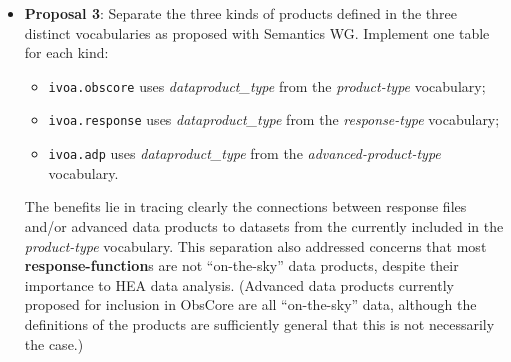 \begin{itemize}
This approach is included largely for compatibility with the ObsCore Recommendation Version 1.1, which has a limited set of {\em dataproduct\_type\/}s and so requires the use of {\em dataproduct\_subtype\/} to discriminate between different data product types that share the same {\em dataproduct\_type\/}.  

A disadvantage of this approach is that queries on two ObsCore attributes are required to identify certain types of data products, for example different types of {\em response-function\/}s.  The interpretation  of the {\em dataproduct\_subtype\/} attribute may be ambiguous as the content could be ({\em e.g.\/}) a type of {\bf response-function}, or a category of image ({\em e.g.\/}, an excess map or significance map) or some specific description chosen by a specific archive.

A standardized vocabulary for {\em dataproduct\_subtype\/} will be beneficial.  We have proposed standardized terms for various types of {\bf response-function}s in \S~5.  However, there are several types of images that are commonly used in \gls{HEA} that could, with some additional discussion, also be standardized.

However, the ability for each individual archive to use {\em dataproduct\_subtype\/} ``to more precisely define the nature of the dataset'' (ObsCore Recommendation Version 1.1 \S~4.1) should not be discounted.  Each archive is likely to have many different types of data products that would otherwise have the same {\em dataproduct\_type\/} that will need to be discriminated to be useful.  Some data products may be unique to a particular observatory but nevertheless highly significant for end-users of that observatory's data.

\item {\bf Proposal 3}: Separate the three kinds of products defined in the three distinct vocabularies as proposed with Semantics WG.
Implement one table for each kind: 
\begin{itemize}
\item {\tt ivoa.obscore} uses {\em dataproduct\_type\/} from the \textsl{product-type} vocabulary;
\item {\tt ivoa.response} uses {\em dataproduct\_type\/} from the \textsl{response-type} vocabulary;
\item {\tt ivoa.adp} uses {\em dataproduct\_type\/} from the \textsl{advanced-product-type} vocabulary.
\end{itemize}

The benefits lie in tracing clearly the connections between response files and/or advanced data products  to datasets from the  currently included in the \textsl{product-type} vocabulary.  This separation also addressed concerns that most {\bf response-function}s are not ``on-the-sky'' data products, despite their importance to \gls{HEA} data analysis.  (Advanced data products currently proposed for inclusion in ObsCore are all ``on-the-sky'' data, although the definitions of the products are sufficiently general that this is not necessarily the case.)


\end{itemize}
